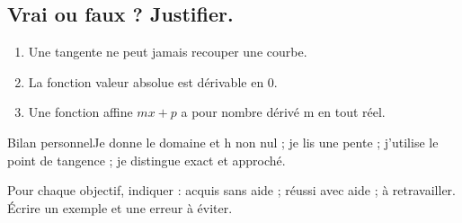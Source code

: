 \subsection*{Vrai ou faux ? Justifier.}\label{C04-VF}
\begin{enumerate}
\item Une tangente ne peut jamais recouper une courbe.
\item La fonction valeur absolue est dérivable en 0.
\item Une fonction affine $mx+p$ a pour nombre dérivé m en tout réel.
\end{enumerate}
\begin{repere}{Bilan personnel}Je donne le domaine et h non nul ; je lis une pente ; j’utilise le point de tangence ; je distingue exact et approché.

Pour chaque objectif, indiquer : acquis sans aide ; réussi avec aide ; à retravailler. Écrire un exemple et une erreur à éviter.\end{repere}
\endgroup
\ifprof\fi
